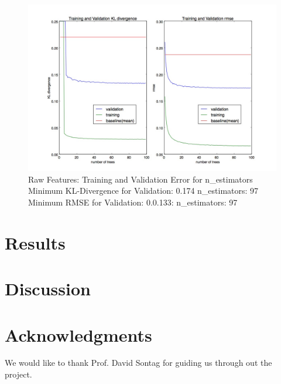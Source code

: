 \documentclass[10pt]{article}
\begin{document}
\begin{figure}
\begin{center}
\includegraphics[scale=0.4]{images/Raw_Features_Random_Forest_n_estimators.jpg}
\caption{Raw Features: Training and Validation Error for n\_estimators \\
         Minimum KL-Divergence for Validation: 0.174 n\_estimators: 97 \\
         Minimum RMSE for Validation: 0.0.133: n\_estimators: 97}
\label{fig:rawdreval}
\end{center}
\end{figure}

\section*{Results}



\section*{Discussion}

\section*{Acknowledgments}

We would like to thank Prof. David Sontag for guiding us through out the project.


\end{document}
